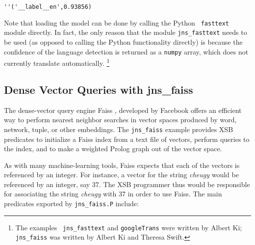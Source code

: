 \begin{verbatim}
''('__label__en',0.93856)
\end{verbatim}

Note that loading the model can be done by calling the Python {\tt
  fasttext} module directly.  In fact, the only reason that the module
{\tt jns\_fasttext} needs to be used (as opposed to calling the Python
functionality directly) is because the confidence of the language
detection is returned as a {\tt numpy} array, which \janus{} does
not currently translate automatically. \footnote{The examples {\tt
    jns\_fasttext} and {\tt googleTrans} were written by Albert Ki;
  {\tt jns\_faiss} was written by Albert Ki and Theresa Swift.}

\subsection{Dense Vector Queries with jns\_faiss}
The dense-vector query engine Faiss \cite{JDH17}, developed by
Facebook offers an efficient way to perform nearest neighbor searches
in vector spaces produced by word, network, tuple, or other
embeddings.  The {\tt jns\_faiss} example provides XSB predicates to
initialize a Faiss index from a text file of vectors, perform queries
to the index, and to make a weighted Prolog graph out of the vector
space.  

As with many machine-learning tools, Faiss expects that each of the
vectors is referenced by an integer.  For instance, a vector for the
string {\em cheugy} would be referenced by an integer, say 37.  The
XSB programmer thus would be responsible for associating the string
{\em cheugy} with 37 in order to use Faiss.  The main predicates
exported by {\tt jns\_faiss.P} include:

